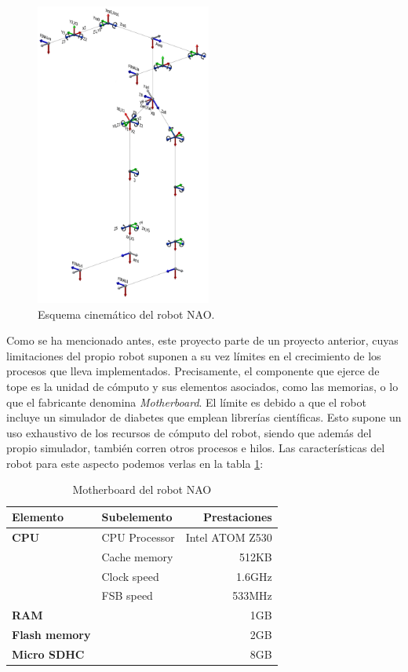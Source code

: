 \documentclass[12pt,spanish,listoffigures,listoftables]{tfgetsinf}
\begin{document}
\begin{figure}[!h]
	\centering
	\includegraphics[height=10cm]{img/NAOCinematico}
	\caption{Esquema cinemático del robot NAO.}
	\label{figura:NAOCinematica}
\end{figure}

Como se ha mencionado antes, este proyecto parte de un proyecto anterior, cuyas limitaciones del propio robot suponen a su vez límites en el crecimiento de los procesos que lleva implementados. Precisamente, el componente que ejerce de tope es la unidad de cómputo y sus elementos asociados, como las memorias, o lo que el fabricante denomina \textit{Motherboard}. El límite es debido a que el robot incluye un simulador de diabetes que emplean librerías científicas. Esto supone un uso exhaustivo de los recursos de cómputo del robot, siendo que además del propio simulador, también corren otros procesos e hilos. Las características del robot para este aspecto podemos verlas en la tabla \ref{tabla:motherboardnao}: \\

\begin{table}[h]
\begin{center}
\begin{tabular}{|l|l|r|}
	\hline 
	\textbf{Elemento} & \textbf{Subelemento} & \textbf{Prestaciones} \\ 
	\hline 
	\textbf{CPU} & CPU Processor & Intel ATOM Z530 \\ 
	\hline 
	& Cache memory  & 512KB \\ 
	\hline 
	& Clock speed & 1.6GHz \\ 
	\hline 
	& FSB speed & 533MHz \\ 
	\hline 
	\textbf{RAM} &  & 1GB \\ 
	\hline 
	\textbf{Flash memory} &  & 2GB \\ 
	\hline 
	\textbf{Micro SDHC} &  & 8GB \\ 
	\hline 
\end{tabular} 
\caption{Motherboard del robot NAO}
\label{tabla:motherboardnao}
\end{center}
\end{table}
\end{document}
